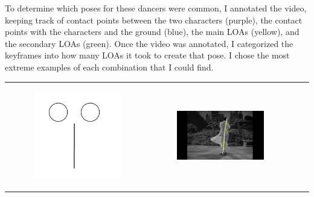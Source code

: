 \newpage

To determine which poses for these dancers were common, I annotated the video, keeping track of contact points between the two characters (purple), the contact points with the characters and the ground (blue), the main LOAs (yellow), and the secondary LOAs (green). Once the video was annotated, I categorized the keyframes into how many LOAs it took to create that pose. I chose the most extreme examples of each combination that I could find.

\begin{table}[!htb]
\centering
\begin{tabular}{cccc}
\centering
\begin{subfigure}{0.2\textwidth}\centering\includegraphics[scale=0.1]{img/01keyframe}\end{subfigure}&
\begin{subfigure}{0.23\textwidth}\centering\includegraphics[scale=0.08]{img/keyframe_case_1_(1)}\end{subfigure}&

\end{tabular}
\end{table}
